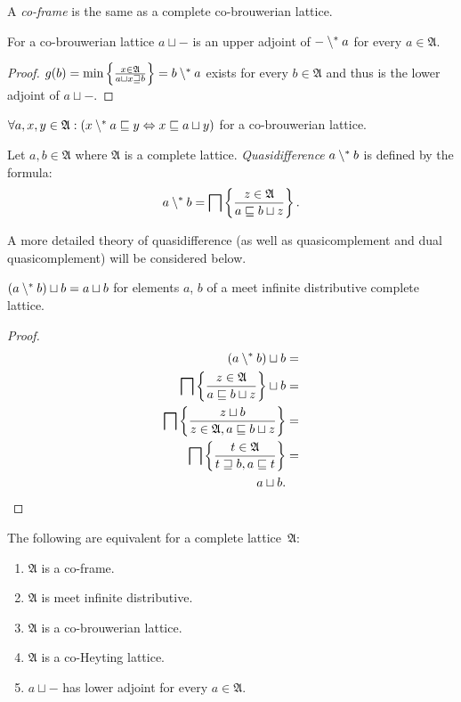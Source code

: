 \begin{defn}
A \emph{co-frame} is the same as a complete co-brouwerian lattice.\end{defn}
\begin{thm}
\label{cobrow-adj}For a co-brouwerian lattice $a\sqcup\mathord-$
is an upper adjoint of $\mathord-\setminus^{\ast} a$ for every $a\in\mathfrak{A}$.\end{thm}
\begin{proof}
$g(b)=\min\left\{ \frac{x\in\mathfrak{A}}{a\sqcup x\sqsupseteq b}\right\}=b\setminus^{\ast} a$
exists for every $b\in\mathfrak{A}$ and thus is the lower adjoint
of $a\sqcup\mathord-$.\end{proof}
\begin{cor}
\label{adjoint-brow-full}$\forall a,x,y\in\mathfrak{A}:(x\setminus^{\ast} a\sqsubseteq y\Leftrightarrow x\sqsubseteq a\sqcup y)$
for a co-brouwerian lattice.\end{cor}
\begin{defn}
Let $a,b\in\mathfrak{A}$ where $\mathfrak{A}$
is a complete lattice. \emph{Quasidifference} $a\setminus^{\ast} b$ is
defined by the formula:
\[
a\setminus^{\ast} b=\bigsqcap\left\{ \frac{z\in\mathfrak{A}}{a\sqsubseteq b\sqcup z}\right\}.
\]
\end{defn}
\begin{rem}
A more detailed theory of quasidifference (as well as quasicomplement
and dual quasicomplement) will be considered below.\end{rem}
\begin{lem}
$(a\setminus^{\ast} b)\sqcup b=a\sqcup b$ for elements $a$, $b$ of a
meet infinite distributive complete lattice.\end{lem}
\begin{proof}
~
\begin{align*}
(a\setminus^{\ast} b)\sqcup b & =\\
\bigsqcap\left\{ \frac{z\in\mathfrak{A}}{a\sqsubseteq b\sqcup z}\right\}\sqcup b & =\\
\bigsqcap\left\{ \frac{z\sqcup b}{z\in\mathfrak{A},a\sqsubseteq b\sqcup z}\right\} & =\\
\bigsqcap\left\{ \frac{t\in\mathfrak{A}}{t\sqsupseteq b,a\sqsubseteq t}\right\} & =\\
a\sqcup b.
\end{align*}
\end{proof}
\begin{thm}
\label{brow-crit}The following are equivalent for a complete lattice~$\mathfrak{A}$:
\begin{enumerate}
\item \label{cobrow-cnd-frame}$\mathfrak{A}$ is a co-frame.
\item \label{cobrow-cnd-dist}$\mathfrak{A}$ is meet infinite distributive.
\item \label{cobrow-cnd-cobrow}$\mathfrak{A}$ is a co-brouwerian lattice.
\item \label{cobrow-cnd-cohey}$\mathfrak{A}$ is a co-Heyting lattice.
\item \label{cobrow-cnd-adj}$a\sqcup\mathord-$ has lower adjoint for every
$a\in\mathfrak{A}$.
\end{enumerate}
\end{thm}
